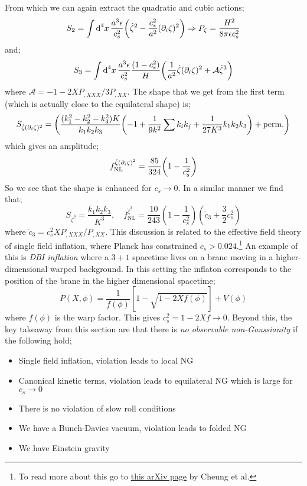 From which we can again extract the quadratic and cubic actions;
\begin{equation*}
S_2 = \int{\upd{^4 x}\frac{a^3 \epsilon}{c_s^2}\left(\dot{\zeta}^2 - \frac{c_s^2}{a^2}(\del_i \zeta)^2\right)} \Rightarrow P_{\zeta} = \frac{H^2}{8\pi \epsilon c_s^2}
\end{equation*}
and;
\begin{equation*}
S_3 = \int{\upd{^4 x}\frac{a^3 \epsilon}{c_s^2}\frac{(1 - c_s^2)}{H} \left(\frac{1}{a^2}\dot{\zeta}(\del_i \zeta)^2 + \mathcal{A}\dot{\zeta}^3\right)}
\end{equation*}
where $\mathcal{A} = -1 - 2XP_{,XXX}/3P_{,XX}$. The shape that we get from the first term (which is actually close to the equilateral shape) is;
\begin{equation*}
S_{\dot{\zeta}(\del_i \zeta)^2} = \left(\frac{(k_1^2 - k_2^2 - k_3^2)K}{k_1 k_2 k_3}\left(-1 + \frac{1}{9k^2}\sum{k_i k_j} + \frac{1}{27K^3}k_1 k_2 k_3\right) + \text{perm.}\right)
\end{equation*}
which gives an amplitude;
\begin{equation*}
f_{\text{NL}}^{\dot{\zeta}(\del_i \zeta)^2} = \frac{85}{324}\left(1 - \frac{1}{c_s^2}\right)
\end{equation*}
So we see that the shape is enhanced for $c_s \rightarrow 0$. In a similar manner we find that;
\begin{equation*}
S_{\dot{\zeta}^3} = \frac{k_1 k_2 k_3}{K^3}, \quad f_{\text{NL}}^{\dot{\zeta}^3} = \frac{10}{243}(1 - \frac{1}{c_s^2})\left(\tilde{c}_3 + \frac{3}{2}c_s^2\right)
\end{equation*}
where $\tilde{c}_3 = c_s^2 X P_{, XXX}/P_{, XX}$. This discussion is related to the effective field theory of single field inflation, where Planck has constrained $c_s > 0.024$.\footnote{To read more about this go to \href{https://arxiv.org/pdf/0709.0293.pdf}{this arXiv page} by Cheung et al.} An example of this is \emph{DBI inflation} where a $3 + 1$ spacetime lives on a brane moving in a higher-dimensional warped background. In this setting the inflaton corresponds to the position of the brane in the higher dimensional spacetime;
\begin{equation}
P(X, \phi) = \frac{1}{f(\phi)}\left[1 - \sqrt{1 - 2Xf(\phi)}\right] + V(\phi)
\end{equation}
where $f(\phi)$ is the warp factor. This gives $c_s^2 = 1 - 2Xf \rightarrow 0$. Beyond this, the key takeaway from this section are that there is \emph{no observable non-Gaussianity} if the following hold;
\begin{itemize}
\item Single field inflation, violation leads to local NG
\item Canonical kinetic terms, violation leads to equilateral NG which is large for $c_s \rightarrow 0$
\item There is no violation of slow roll conditions
\item We have a Bunch-Davies vacuum, violation leads to folded NG
\item We have Einstein gravity
\end{itemize}
\newpage

